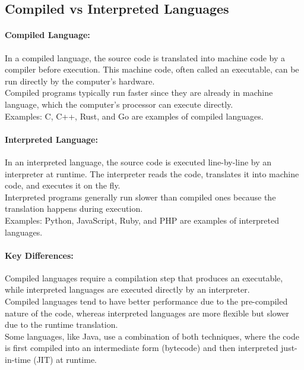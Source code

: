 \documentclass[12pt,halfline,a4paper,]{ouparticle}
\begin{document}
\hypertarget{compiled-vs-interpreted-languages}{%
\subsection{Compiled vs Interpreted
Languages}\label{compiled-vs-interpreted-languages}}

\hypertarget{compiled-language}{%
\paragraph{Compiled Language:}\label{compiled-language}}

\hfill\break
In a compiled language, the source code is translated into machine code
by a compiler before execution. This machine code, often called an
executable, can be run directly by the computer's hardware.\\
Compiled programs typically run faster since they are already in machine
language, which the computer's processor can execute directly.\\
Examples: C, C++, Rust, and Go are examples of compiled languages.

\hypertarget{interpreted-language}{%
\paragraph{Interpreted Language:}\label{interpreted-language}}

\hfill\break
In an interpreted language, the source code is executed line-by-line by
an interpreter at runtime. The interpreter reads the code, translates it
into machine code, and executes it on the fly.\\
Interpreted programs generally run slower than compiled ones because the
translation happens during execution.\\
Examples: Python, JavaScript, Ruby, and PHP are examples of interpreted
languages.

\hypertarget{key-differences}{%
\paragraph{Key Differences:}\label{key-differences}}

Compiled languages require a compilation step that produces an
executable, while interpreted languages are executed directly by an
interpreter.\\
Compiled languages tend to have better performance due to the
pre-compiled nature of the code, whereas interpreted languages are more
flexible but slower due to the runtime translation.\\
Some languages, like Java, use a combination of both techniques, where
the code is first compiled into an intermediate form (bytecode) and then
interpreted just-in-time (JIT) at runtime.\\
\end{document}
